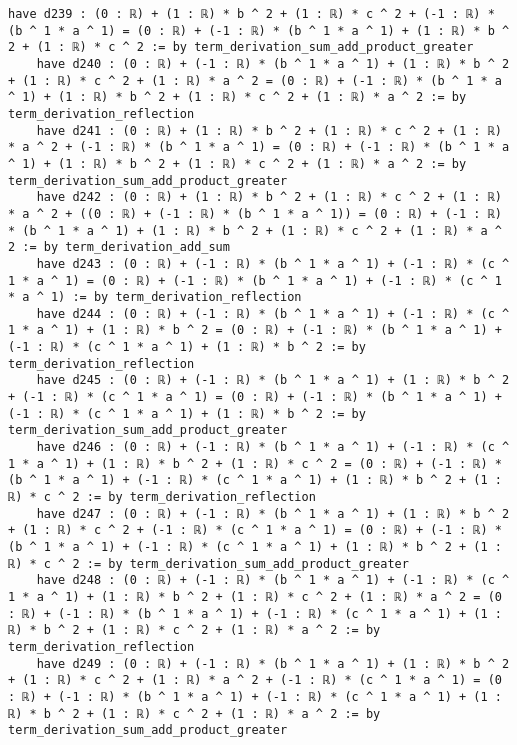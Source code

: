 \documentclass{article}
\begin{document}
\begin{tcolorbox}[colback=white!10, width=\linewidth]
\begin{lstlisting}[language=Lean4]
    have d239 : (0 : ℝ) + (1 : ℝ) * b ^ 2 + (1 : ℝ) * c ^ 2 + (-1 : ℝ) * (b ^ 1 * a ^ 1) = (0 : ℝ) + (-1 : ℝ) * (b ^ 1 * a ^ 1) + (1 : ℝ) * b ^ 2 + (1 : ℝ) * c ^ 2 := by term_derivation_sum_add_product_greater
    have d240 : (0 : ℝ) + (-1 : ℝ) * (b ^ 1 * a ^ 1) + (1 : ℝ) * b ^ 2 + (1 : ℝ) * c ^ 2 + (1 : ℝ) * a ^ 2 = (0 : ℝ) + (-1 : ℝ) * (b ^ 1 * a ^ 1) + (1 : ℝ) * b ^ 2 + (1 : ℝ) * c ^ 2 + (1 : ℝ) * a ^ 2 := by term_derivation_reflection
    have d241 : (0 : ℝ) + (1 : ℝ) * b ^ 2 + (1 : ℝ) * c ^ 2 + (1 : ℝ) * a ^ 2 + (-1 : ℝ) * (b ^ 1 * a ^ 1) = (0 : ℝ) + (-1 : ℝ) * (b ^ 1 * a ^ 1) + (1 : ℝ) * b ^ 2 + (1 : ℝ) * c ^ 2 + (1 : ℝ) * a ^ 2 := by term_derivation_sum_add_product_greater
    have d242 : (0 : ℝ) + (1 : ℝ) * b ^ 2 + (1 : ℝ) * c ^ 2 + (1 : ℝ) * a ^ 2 + ((0 : ℝ) + (-1 : ℝ) * (b ^ 1 * a ^ 1)) = (0 : ℝ) + (-1 : ℝ) * (b ^ 1 * a ^ 1) + (1 : ℝ) * b ^ 2 + (1 : ℝ) * c ^ 2 + (1 : ℝ) * a ^ 2 := by term_derivation_add_sum
    have d243 : (0 : ℝ) + (-1 : ℝ) * (b ^ 1 * a ^ 1) + (-1 : ℝ) * (c ^ 1 * a ^ 1) = (0 : ℝ) + (-1 : ℝ) * (b ^ 1 * a ^ 1) + (-1 : ℝ) * (c ^ 1 * a ^ 1) := by term_derivation_reflection
    have d244 : (0 : ℝ) + (-1 : ℝ) * (b ^ 1 * a ^ 1) + (-1 : ℝ) * (c ^ 1 * a ^ 1) + (1 : ℝ) * b ^ 2 = (0 : ℝ) + (-1 : ℝ) * (b ^ 1 * a ^ 1) + (-1 : ℝ) * (c ^ 1 * a ^ 1) + (1 : ℝ) * b ^ 2 := by term_derivation_reflection
    have d245 : (0 : ℝ) + (-1 : ℝ) * (b ^ 1 * a ^ 1) + (1 : ℝ) * b ^ 2 + (-1 : ℝ) * (c ^ 1 * a ^ 1) = (0 : ℝ) + (-1 : ℝ) * (b ^ 1 * a ^ 1) + (-1 : ℝ) * (c ^ 1 * a ^ 1) + (1 : ℝ) * b ^ 2 := by term_derivation_sum_add_product_greater
    have d246 : (0 : ℝ) + (-1 : ℝ) * (b ^ 1 * a ^ 1) + (-1 : ℝ) * (c ^ 1 * a ^ 1) + (1 : ℝ) * b ^ 2 + (1 : ℝ) * c ^ 2 = (0 : ℝ) + (-1 : ℝ) * (b ^ 1 * a ^ 1) + (-1 : ℝ) * (c ^ 1 * a ^ 1) + (1 : ℝ) * b ^ 2 + (1 : ℝ) * c ^ 2 := by term_derivation_reflection
    have d247 : (0 : ℝ) + (-1 : ℝ) * (b ^ 1 * a ^ 1) + (1 : ℝ) * b ^ 2 + (1 : ℝ) * c ^ 2 + (-1 : ℝ) * (c ^ 1 * a ^ 1) = (0 : ℝ) + (-1 : ℝ) * (b ^ 1 * a ^ 1) + (-1 : ℝ) * (c ^ 1 * a ^ 1) + (1 : ℝ) * b ^ 2 + (1 : ℝ) * c ^ 2 := by term_derivation_sum_add_product_greater
    have d248 : (0 : ℝ) + (-1 : ℝ) * (b ^ 1 * a ^ 1) + (-1 : ℝ) * (c ^ 1 * a ^ 1) + (1 : ℝ) * b ^ 2 + (1 : ℝ) * c ^ 2 + (1 : ℝ) * a ^ 2 = (0 : ℝ) + (-1 : ℝ) * (b ^ 1 * a ^ 1) + (-1 : ℝ) * (c ^ 1 * a ^ 1) + (1 : ℝ) * b ^ 2 + (1 : ℝ) * c ^ 2 + (1 : ℝ) * a ^ 2 := by term_derivation_reflection
    have d249 : (0 : ℝ) + (-1 : ℝ) * (b ^ 1 * a ^ 1) + (1 : ℝ) * b ^ 2 + (1 : ℝ) * c ^ 2 + (1 : ℝ) * a ^ 2 + (-1 : ℝ) * (c ^ 1 * a ^ 1) = (0 : ℝ) + (-1 : ℝ) * (b ^ 1 * a ^ 1) + (-1 : ℝ) * (c ^ 1 * a ^ 1) + (1 : ℝ) * b ^ 2 + (1 : ℝ) * c ^ 2 + (1 : ℝ) * a ^ 2 := by term_derivation_sum_add_product_greater

\end{lstlisting}
\end{tcolorbox}
\end{document}
